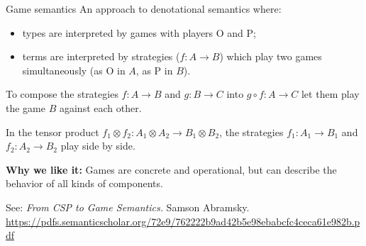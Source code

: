 \documentclass{beamer}
\begin{document}
\begin{frame}{Game semantics}
  An approach to denotational semantics where:
  \begin{itemize}
    \item types are interpreted by games with players O and P;
    \item terms are interpreted by strategies ($f : A \rightarrow B$)
      which play two games simultaneously (as O in $A$, as P in $B$).
  \end{itemize}

  \vfill
  To compose the strategies $f : A \rightarrow B$ and $g : B \rightarrow C$
  into $g \circ f : A \rightarrow C$
  let them play the game $B$ against each other.

  In the tensor product
  $f_1 \otimes f_2 : A_1 \otimes A_2 \rightarrow B_1 \otimes B_2$,
  the strategies $f_1 : A_1 \rightarrow B_1$ and $f_2: A_2 \rightarrow B_2$
  play side by side.

  \vfill
  \textbf{Why we like it:}
  Games are concrete and operational,
  but can describe the behavior of all kinds of components.

  \vfill \small
  See: \emph{From CSP to Game Semantics.}
  Samson Abramsky.
  \footnotesize
  \url{https://pdfs.semanticscholar.org/72e9/762222b9ad42b5e98ebabcfc4ceca61e982b.pdf}
\end{frame}
\end{document}
